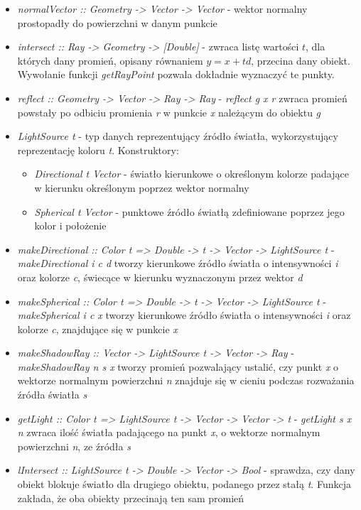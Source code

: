 \documentclass[11pt,a4paper]{article}
\begin{document}
\begin{itemize}
\item\textit{normalVector :: Geometry -> Vector -> Vector} - wektor normalny prostopadły do powierzchni w danym punkcie
\item\textit{intersect :: Ray -> Geometry -> [Double]} - zwraca listę wartości $t$, dla których dany promień, opisany równaniem $y = x+td$, przecina dany obiekt. Wywołanie funkcji \textit{getRayPoint} pozwala dokładnie wyznaczyć te punkty.
\item\textit{reflect :: Geometry -> Vector -> Ray -> Ray} - \textit{reflect g x r} zwraca promień powstały po odbiciu promienia \textit{r} w punkcie \textit{x} należącym do obiektu \textit{g}
\item\textit{LightSource t} - typ danych reprezentujący źródło światła, wykorzystujący reprezentację koloru \textit{t}. Konstruktory:
\begin{itemize}
\item\textit{Directional t Vector} - światło kierunkowe o określonym kolorze padające w kierunku określonym poprzez wektor normalny
\item\textit{Spherical t Vector} - punktowe źródło światłą zdefiniowane poprzez jego kolor i położenie
\end{itemize}
\item\textit{makeDirectional :: Color t => Double -> t -> Vector -> LightSource t} - \textit{makeDirectional i c d} tworzy kierunkowe źródło światła o intensywności \textit{i} oraz kolorze \textit{c}, świecące w kierunku wyznaczonym przez wektor \textit{d}
\item\textit{makeSpherical :: Color t => Double -> t -> Vector -> LightSource t} - \textit{makeSpherical i c x} tworzy kierunkowe źródło światła o intensywności \textit{i} oraz kolorze \textit{c}, znajdujące się w punkcie \textit{x}
\item\textit{makeShadowRay :: Vector -> LightSource t -> Vector -> Ray} - \textit{makeShadowRay n s x} tworzy promień pozwalający ustalić, czy punkt \textit{x} o wektorze normalnym powierzchni \textit{n} znajduje się w cieniu podczas rozważania źródła światła \textit{s}
\item\textit{getLight :: Color t => LightSource t -> Vector -> Vector -> t} - \textit{getLight s x n} zwraca ilość światła padającego na punkt \textit{x}, o wektorze normalnym powierzchni \textit{n}, ze źródła \textit{s}
\item\textit{lIntersect :: LightSource t -> Double -> Vector -> Bool} - sprawdza, czy dany obiekt blokuje światło dla drugiego obiektu, podanego przez stałą \textit{t}. Funkcja zakłada, że oba obiekty przecinają ten sam promień
\end{itemize}
\end{document}
